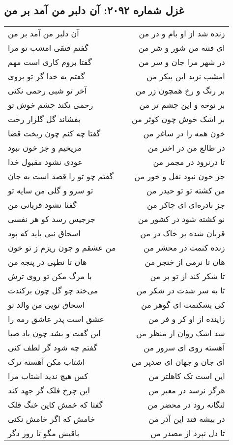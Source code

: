 \begin{center}
\section*{غزل شماره ۲۰۹۲: آن دلبر من آمد بر من}
\label{sec:2092}
\begin{longtable}{l p{0.5cm} r}
آن دلبر من آمد بر من
&&
زنده شد از او بام و در من
\\
گفتم قنقی امشب تو مرا
&&
ای فتنه من شور و شر من
\\
گفتا بروم کاری است مهم
&&
در شهر مرا جان و سر من
\\
گفتم به خدا گر تو بروی
&&
امشب نزید این پیکر من
\\
آخر تو شبی رحمی نکنی
&&
بر رنگ و رخ همچون زر من
\\
رحمی نکند چشم خوش تو
&&
بر نوحه و این چشم تر من
\\
بفشاند گل گلزار رخت
&&
بر اشک خوش چون کوثر من
\\
گفتا چه کنم چون ریخت قضا
&&
خون همه را در ساغر من
\\
مریخیم و جز خون نبود
&&
در طالع من در اختر من
\\
عودی نشود مقبول خدا
&&
تا درنرود در مجمر من
\\
گفتم چو تو را قصد است به جان
&&
جز خون نبود نقل و خور من
\\
تو سرو و گلی من سایه تو
&&
من کشته تو تو حیدر من
\\
گفتا نشود قربانی من
&&
جز نادره‌ای ای چاکر من
\\
جرجیس رسد کو هر نفسی
&&
نو کشته شود در کشور من
\\
اسحاق نبی باید که بود
&&
قربان شده بر خاک در من
\\
من عشقم و چون ریزم ز تو خون
&&
زنده کنمت در محشر من
\\
هان تا نطپی در پنجه من
&&
هان تا نرمی از خنجر من
\\
با مرگ مکن تو روی ترش
&&
تا شکر کند از تو بر من
\\
می‌خند چو گل چون برکندت
&&
تا به سر شدت در شکر من
\\
اسحاق تویی من والد تو
&&
کی بشکنمت ای گوهر من
\\
عشق است پدر عاشق رمه را
&&
زاینده از او کر و فر من
\\
این گفت و بشد چون باد صبا
&&
شد اشک روان از منظر من
\\
گفتم چه شود گر لطف کنی
&&
آهسته روی ای سرور من
\\
اشتاب مکن آهسته ترک
&&
ای جان و جهان ای صدپر من
\\
کس هیچ ندید اشتاب مرا
&&
این است تک کاهلتر من
\\
این چرخ فلک گر جهد کند
&&
هرگز نرسد در معبر من
\\
گفتا که خمش کاین خنگ فلک
&&
لنگانه رود در محضر من
\\
خامش که اگر خامش نکنی
&&
در بیشه فتد این آذر من
\\
باقیش مگو تا روز دگر
&&
تا دل نپرد از مصدر من
\\
\end{longtable}
\end{center}
